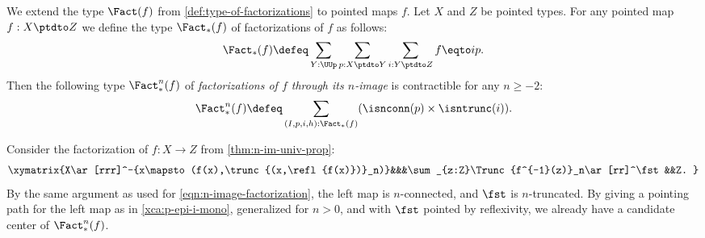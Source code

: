 \begin{remark}\label{rem:n-im-ptd-map}
We extend the type $\Fact(f)$ from \cref{def:type-of-factorizations}
to pointed maps $f$.
Let $X$ and $Z$ be pointed types. For any pointed map $f:X\ptdto Z$ we define
the type $\Fact_*(f)$ of factorizations of $f$ as follows:
\[
\Fact_*(f)\defeq \sum_{Y:\UUp}\sum_{p:X\ptdto Y}\sum_{i:Y\ptdto Z} 
f\eqto i p.
\]
Then the following type $\Fact_*^n(f)$ of \emph{factorizations of $f$ through 
its $n$-image} is contractible for any $n\geq -2$:
\[
  \Fact_*^n(f) \defeq\sum_{(I,p,i,h):\Fact_*(f)} 
                   (\isnconn(p) \times \isntrunc(i)).
  \]

Consider the factorization of $f: X\to Z$ from \cref{thm:n-im-univ-prop}:
\[
\xymatrix{X\ar[rrr]^-{x\mapsto (f(x),\trunc{(x,\refl{f(x)})}_n)}&&&\sum_{z:Z}\Trunc{f^{-1}(z)}_n\ar[rr]^\fst&&Z.
}\]
By the same argument as used for \cref{eqn:n-image-factorization},
the left map is $n$-connected, and $\fst$ is $n$-truncated.
By giving a pointing path for the left map as in \cref{xca:p-epi-i-mono}, 
generalized for $n>0$, and with $\fst$ pointed by reflexivity,
we already have a candidate center of $\Fact_*^n(f)$.


\end{remark}
